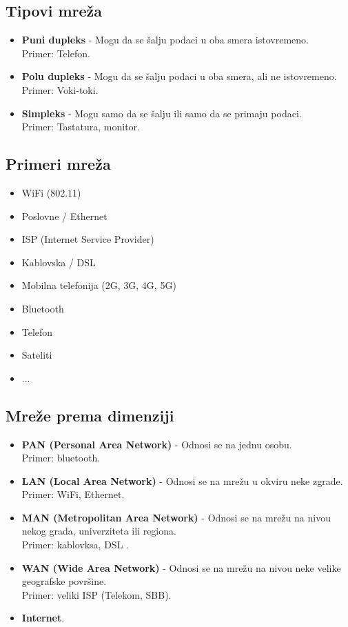 \documentclass[a4paper]{article}
\begin{document}
    \subsection{Tipovi mreža}
        \begin{itemize}
            \item \textbf{Puni dupleks} - Mogu da se šalju podaci u oba smera istovremeno.\\
                  Primer: Telefon.
            \item \textbf{Polu dupleks} - Mogu da se šalju podaci u oba smera, ali ne istovremeno.\\
                  Primer: Voki-toki.
            \item \textbf{Simpleks} - Mogu samo da se šalju ili samo da se primaju podaci.\\
                  Primer: Tastatura, monitor.
        \end{itemize}
    \subsection{Primeri mreža}
        \begin{itemize}
            \item WiFi (802.11) 
            \item Poslovne / Ethernet 
            \item ISP (Internet Service Provider) 
            \item Kablovska / DSL 
            \item Mobilna telefonija (2G, 3G, 4G, 5G) 
            \item Bluetooth 
            \item Telefon 
            \item Sateliti 
            \item ...
        \end{itemize}
    \subsection{Mreže prema dimenziji}
        \begin{itemize}
            \item \textbf{PAN (Personal Area Network)} - Odnosi se na jednu osobu.\\
                  Primer: bluetooth.
            \item \textbf{LAN (Local Area Network)} - Odnosi se na mrežu u okviru neke zgrade.\\
                  Primer: WiFi, Ethernet.
            \item \textbf{MAN (Metropolitan Area Network)} - Odnosi se na mrežu na nivou nekog grada,
                  univerziteta ili regiona.\\
                  Primer: kablovksa, DSL .
            \item \textbf{WAN (Wide Area Network)} - Odnosi se na mrežu na nivou neke velike geografske površine.\\
                  Primer: veliki ISP (Telekom, SBB).
            \item \textbf{Internet}.
        \end{itemize}
\end{document}
